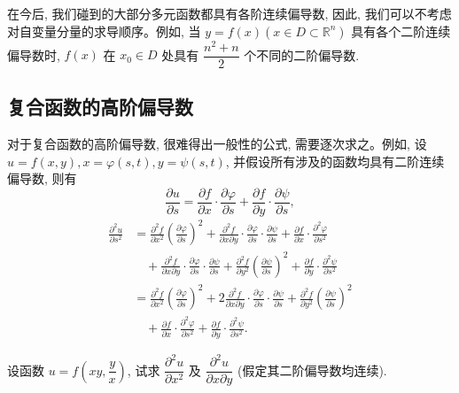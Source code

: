 在今后, 我们碰到的大部分多元函数都具有各阶连续偏导数, 因此, 我们可以不考虑对自变量分量的求导顺序。例如, 当 $y=f(x)(x\in D\subset\mathbb R^n)$ 具有各个二阶连续偏导数时, $f(x)$ 在 $x_0\in D$ 处具有 $\dfrac{n^2+n}{2}$ 个不同的二阶偏导数.

\subsection{复合函数的高阶偏导数}
\label{subsec:ma-14-2-4}

对于复合函数的高阶偏导数, 很难得出一般性的公式, 需要逐次求之。例如, 设 $u=f(x,y),x=\varphi(s,t),y=\psi(s,t)$, 并假设所有涉及的函数均具有二阶连续偏导数, 则有
\[
  \frac{\partial u}{\partial s}
  =\frac{\partial f}{\partial x}\cdot\frac{\partial\varphi}{\partial s}
  +\frac{\partial f}{\partial y}\cdot\frac{\partial\psi}{\partial s},
\]
\[
\begin{aligned}
  \frac{\partial^2u}{\partial s^2}
  &=\frac{\partial^2 f}{\partial x^2}\left(\frac{\partial\varphi}{\partial s}\right)^2
  +\frac{\partial^2 f}{\partial x\partial y}\cdot
  \frac{\partial\varphi}{\partial s}\cdot\frac{\partial\psi}{\partial s}
  +\frac{\partial f}{\partial x}\cdot\frac{\partial^2\varphi}{\partial s^2}\\
  &\quad+\frac{\partial^2 f}{\partial x\partial y}\cdot
  \frac{\partial\varphi}{\partial s}\cdot\frac{\partial\psi}{\partial s}
  +\frac{\partial^2 f}{\partial y^2}\left(\frac{\partial\psi}{\partial s}\right)^2
  +\frac{\partial f}{\partial y}\cdot\frac{\partial^2\psi}{\partial s^2}\\
  &=\frac{\partial^2 f}{\partial x^2}\left(\frac{\partial\varphi}{\partial s}\right)^2
  +2\frac{\partial^2 f}{\partial x\partial y}\cdot
  \frac{\partial\varphi}{\partial s}\cdot\frac{\partial\psi}{\partial s}
  +\frac{\partial^2 f}{\partial y^2}\left(\frac{\partial\psi}{\partial s}\right)^2\\
  &\quad+\frac{\partial f}{\partial x}\cdot\frac{\partial^2\varphi}{\partial s^2}
  +\frac{\partial f}{\partial y}\cdot\frac{\partial^2\psi}{\partial s^2}.
\end{aligned}
\]

\begin{example}\label{example:ma-14-2-8}
设函数 $u=f\left(xy,\dfrac yx\right)$, 试求 $\dfrac{\partial^2u}{\partial x^2}$ 及 $\dfrac{\partial^2u}{\partial x\partial y}$ (假定其二阶偏导数均连续).
\end{example}


